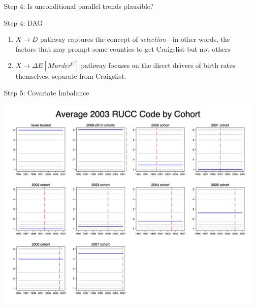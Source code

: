 \documentclass{beamer}
\begin{document}
\begin{frame}{Step 4: Is unconditional parallel trends plausible?}

\begin{figure}[h!]
    \centering
\end{figure}

\end{frame}

\begin{frame}{Step 4: DAG}

\begin{enumerate}

\item  \(X \rightarrow D\) pathway captures the concept of \emph{selection}—in other words, the factors that may prompt some counties to get Craigslist but not others

\item  \(X \rightarrow \Delta E[Murder^0]\) pathway focuses on the direct drivers of birth rates themselves, separate from Craigslist. 

\end{enumerate}

\end{frame}

\begin{frame}{Step 5: Covariate Imbalance}

    \begin{center}
        \includegraphics[width=0.75\linewidth,keepaspectratio]{./lecture_includes/pretty_RUCC.jpg}
    \end{center}
\end{frame}
\end{document}
